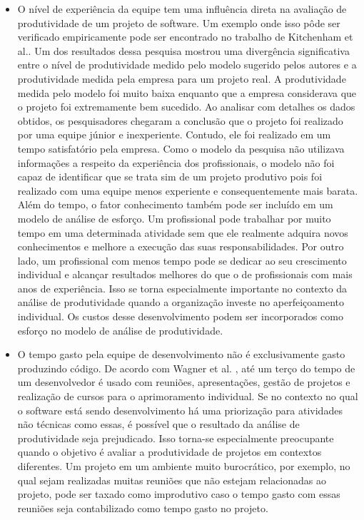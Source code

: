 \begin{itemize}

\item O nível de experiência  da equipe tem uma influência direta na avaliação de produtividade de um projeto de software.  Um exemplo onde isso pôde ser verificado empiricamente pode ser encontrado no trabalho de Kitchenham et al.\cite{kitchenham2004software}. Um dos resultados dessa pesquisa mostrou uma divergência significativa entre o nível de produtividade medido pelo modelo sugerido pelos autores e a produtividade medida pela empresa para um projeto real. A produtividade medida pelo modelo foi muito baixa enquanto que a empresa considerava que o projeto foi  extremamente bem sucedido. Ao analisar com detalhes os dados obtidos, os pesquisadores chegaram a conclusão que o projeto foi realizado por uma equipe júnior e inexperiente. Contudo, ele foi realizado em um tempo satisfatório pela empresa. Como o modelo da pesquisa não utilizava informações a respeito da experiência dos profissionais, o modelo não foi capaz de identificar que se trata  sim de um projeto produtivo pois foi realizado com uma equipe menos experiente e consequentemente mais barata. 
Além do tempo, o fator conhecimento também pode ser incluído em um modelo de análise de esforço. Um profissional pode trabalhar por muito tempo em uma determinada atividade sem que ele realmente adquira novos conhecimentos e melhore a execução das suas responsabilidades. Por outro lado, um profissional com menos tempo pode se dedicar ao seu crescimento individual e alcançar resultados melhores do que o de profissionais com mais anos de experiência. Isso se torna especialmente importante no contexto da análise de produtividade quando a organização investe no aperfeiçoamento individual. Os custos desse desenvolvimento podem ser incorporados como esforço no modelo de análise de produtividade.
\item O tempo gasto pela equipe de desenvolvimento não é exclusivamente gasto produzindo código. De acordo com Wagner et al. \cite{wagner2018systematic}, até um terço do tempo de um  desenvolvedor é  usado com reuniões, apresentações, gestão de projetos e realização de cursos para o aprimoramento individual. Se no contexto no qual o software está sendo desenvolvimento há uma priorização para atividades não técnicas como essas, é possível que o resultado da análise de produtividade seja prejudicado. Isso torna-se especialmente preocupante quando o objetivo é avaliar a produtividade de projetos em contextos diferentes. Um projeto em um ambiente muito burocrático, por exemplo, no qual sejam realizadas muitas reuniões que não estejam relacionadas ao projeto, pode ser taxado como improdutivo caso o tempo gasto com essas reuniões seja contabilizado como tempo gasto no projeto.


\end{itemize}
